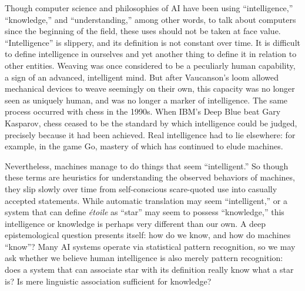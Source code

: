 Though computer science and philosophies of AI have been using
``intelligence,'' ``knowledge,'' and ``understanding,'' among other
words, to talk about computers since the beginning of the field, these
uses should not be taken at face value. “Intelligence” is slippery,
and its definition is not constant over time. It is difficult to
define intelligence in ourselves\cite{???} and yet another thing to define it
in relation to other entities. Weaving was once considered to be a
peculiarly human capability, a sign of an advanced, intelligent
mind.\cite{???} But after Vaucanson's loom allowed mechanical devices to weave
seemingly on their own, this capacity was no longer seen as uniquely
human, and was no longer a marker of intelligence. The same process
occurred with chess in the 1990s. When IBM's Deep Blue beat Gary
Kasparov, chess ceased to be the standard by which intelligence could
be judged, precisely because it had been achieved. Real intelligence
had to lie elsewhere: for example, in the game Go, mastery of which
has continued to elude machines.\cite{???}

Nevertheless, machines manage to do things that seem “intelligent.” So
though these terms are heuristics for understanding the observed
behaviors of machines, they slip slowly over time from self-conscious
scare-quoted use into casually accepted statements. While automatic
translation may seem ``intelligent,'' or a system that can define \emph{\'{e}toile}
as ``star'' may seem to possess ``knowledge,'' this intelligence or
knowledge is perhaps very different than our own. A deep
epistemological question presents itself: how do we know, and how do
machines ``know''? Many AI systems operate via statistical pattern
recognition, so we may ask whether we believe human intelligence is
also merely pattern recognition: does a system that can associate star
with its definition really know what a star is? Is mere linguistic
association sufficient for knowledge?

